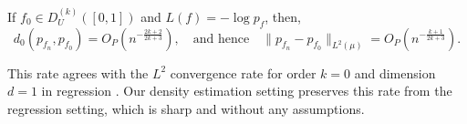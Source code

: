 \begin{theorem}
\label{thm:l2-convergence-hal-mle}
If $f_0 \in D^{(k)}_U([0,1])$ and $L(f) = -\log p_f$, then,
\[
d_{0}(p_{f_n},p_{f_{0}}) = O_P\!\left(n^{-\frac{2k+2}{2k+3}}\right),
\quad \text{and hence} \quad
\lVert p_{f_n} - p_{f_{0}}\rVert_{L^2(\mu)} = O_P\!\left(n^{-\frac{k+1}{2k+3}}\right).
\]
\end{theorem}



This rate agrees with the $L^2$ convergence rate for order $k=0$ and dimension $d=1$ in regression \citep{mammen1997locally, tibshirani2014adaptive, bibaut2019fast}.
Our density estimation setting preserves this rate from the regression setting, which is sharp and without any assumptions.


